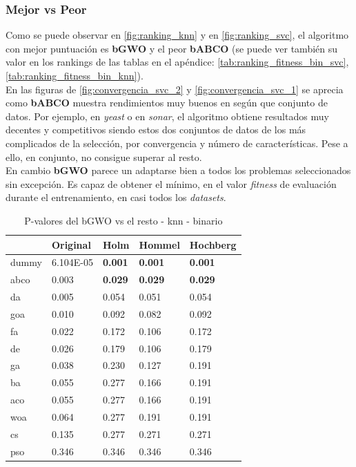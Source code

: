 \subsubsection{Mejor vs Peor}
Como se puede observar en \ref{fig:ranking_knn} y en \ref{fig:ranking_svc}, el algoritmo con mejor puntuación es \textbf{bGWO} y el peor \textbf{bABCO} (se puede ver también su valor en los rankings de las tablas en el apéndice: \ref{tab:ranking_fitness_bin_svc}, \ref{tab:ranking_fitness_bin_knn}). \\[6pt]
En las figuras de \ref{fig:convergencia_svc_2} y \ref{fig:convergencia_svc_1} se aprecia como \textbf{bABCO} muestra rendimientos muy buenos en según que conjunto de datos. Por ejemplo, en \textit{yeast} o en \textit{sonar}, el algoritmo obtiene resultados muy decentes y competitivos siendo estos dos conjuntos de datos de los más complicados de la selección, por convergencia y número de características. Pese a ello, en conjunto, no consigue superar al resto.\\[6pt]
En cambio \textbf{bGWO} parece un adaptarse bien a todos los problemas seleccionados sin excepción. Es capaz de obtener el mínimo, en el valor \textit{fitness} de evaluación durante el entrenamiento, en casi todos los \textit{datasets}.

\begin{table}[htp]
    \centering
    \begin{tabular}{lllll}
        \toprule
        {}    & Original  & Holm           & Hommel         & Hochberg       \\
        \midrule
        dummy & 6.104E-05 & \textbf{0.001} & \textbf{0.001} & \textbf{0.001} \\
        abco  & 0.003     & \textbf{0.029} & \textbf{0.029} & \textbf{0.029} \\
        da    & 0.005     & 0.054          & 0.051          & 0.054          \\
        goa   & 0.010     & 0.092          & 0.082          & 0.092          \\
        fa    & 0.022     & 0.172          & 0.106          & 0.172          \\
        de    & 0.026     & 0.179          & 0.106          & 0.179          \\
        ga    & 0.038     & 0.230          & 0.127          & 0.191          \\
        ba    & 0.055     & 0.277          & 0.166          & 0.191          \\
        aco   & 0.055     & 0.277          & 0.166          & 0.191          \\
        woa   & 0.064     & 0.277          & 0.191          & 0.191          \\
        cs    & 0.135     & 0.277          & 0.271          & 0.271          \\
        pso   & 0.346     & 0.346          & 0.346          & 0.346          \\
        \bottomrule
    \end{tabular}
    \caption{P-valores del bGWO vs el resto - knn - binario}
    \label{tab:p-values_gwo_vs_rest_knn}
\end{table}

